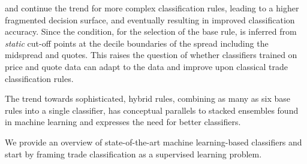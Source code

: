 \textcite[][3811]{chakrabartyTradeClassificationAlgorithms2007} and \textcite[][18]{grauerOptionTradeClassification2022} continue the trend for more complex classification rules, leading to a higher fragmented decision surface, and eventually resulting in improved classification accuracy. Since the condition, for the selection of the base rule, is inferred from \emph{static} cut-off points at the decile boundaries of the spread including the midspread and quotes. This raises the question of whether classifiers trained on price and quote data can adapt to the data and improve upon classical trade classification rules.

The trend towards sophisticated, hybrid rules, combining as many as six base rules into a single classifier, has conceptual parallels to stacked ensembles found in machine learning and expresses the need for better classifiers.

We provide an overview of state-of-the-art machine learning-based classifiers and start by framing trade classification as a supervised learning
problem.